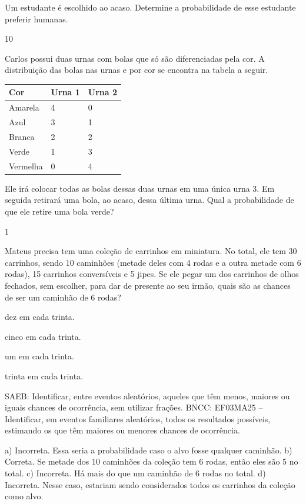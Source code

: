 \begin{escolha}
{\begin{escolha}
Um estudante é escolhido ao acaso. Determine a probabilidade de esse
estudante preferir humanas.


\num{10}

Carlos possui duas urnas com bolas que só são diferenciadas pela cor. A
distribuição das bolas nas urnas e por cor se encontra na tabela a
seguir.

\begin{longtable}[]{@{}lll@{}}
\toprule
Cor & Urna 1 & Urna 2\tabularnewline
\midrule
\endhead
Amarela & 4 & 0\tabularnewline
Azul & 3 & 1\tabularnewline
Branca & 2 & 2\tabularnewline
Verde & 1 & 3\tabularnewline
Vermelha & 0 & 4\tabularnewline
\bottomrule
\end{longtable}

Ele irá colocar todas as bolas dessas duas urnas em uma única urna 3. Em
seguida retirará uma bola, ao acaso, dessa última urna. Qual a
probabilidade de que ele retire uma bola verde?



\num{1}

Mateus precisa tem uma coleção de carrinhos em miniatura. No total, ele tem 30 carrinhos, sendo 10 caminhões (metade deles com 4 rodas e a outra metade com 6 rodas), 15 carrinhos conversíveis e 5 jipes. Se ele pegar um dos carrinhos de olhos fechados, sem escolher, para dar de presente ao seu irmão, quais são as chances de ser um caminhão de 6 rodas?

\begin{escolha}
\item
  dez em cada trinta.
\item
  cinco em cada trinta.
\item
  um em cada trinta.
\item
  trinta em cada trinta.
\end{escolha}

SAEB: Identificar, entre eventos aleatórios, aqueles que têm menos, maiores ou iguais chances de ocorrência, sem utilizar frações. 
BNCC: EF03MA25 -- Identificar, em eventos familiares aleatórios, todos os resultados possíveis,
estimando os que têm maiores ou menores chances de ocorrência.


a) Incorreta. Essa seria a probabilidade caso o alvo fosse qualquer caminhão.
b) Correta. Se metade dos 10 caminhões da coleção tem 6 rodas, então eles são 5 no total.
c) Incorreta. Há mais do que um caminhão de 6 rodas no total.
d) Incorreta. Nesse caso, estariam sendo considerados todos os carrinhos da coleção como alvo.


\end{escolha}}
\end{escolha}
